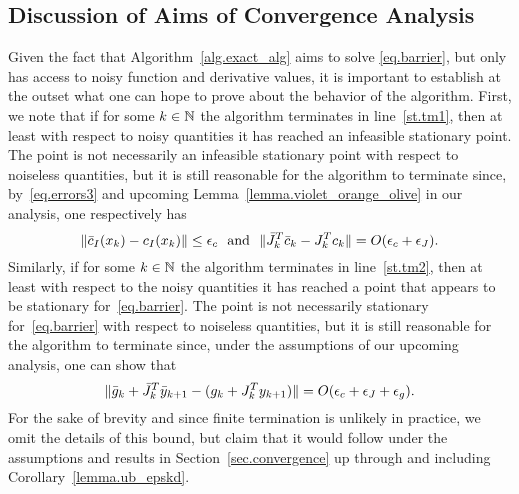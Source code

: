 \subsection{Discussion of Aims of Convergence Analysis}\label{sec.discussion}

Given the fact that Algorithm~\ref{alg.exact_alg} aims to solve \eqref{eq.barrier}, but only has access to noisy function and derivative values, it is important to establish at the outset what one can hope to prove about the behavior of the algorithm.  First, we note that if for some $k \in \mathbb{N}$ the algorithm terminates in line~\ref{st.tm1}, then at least with respect to noisy quantities it has reached an infeasible stationary point.  The point is not necessarily an infeasible stationary point with respect to noiseless quantities, but it is still reasonable for the algorithm to terminate since, by~\eqref{eq.errors3} and upcoming Lemma~\ref{lemma.violet_orange_olive} in our analysis, one respectively has
\begin{equation*}
  \|\ctrue_I(x_k) - c_I(x_k)\| \leq \epsilon_c\ \ \text{and}\ \ \|\Jtrue_k^T \ctrue_k - J_k^T c_k\| = O(\eps_c + \eps_J).
\end{equation*}
Similarly, if for some $k \in \mathbb{N}$ the algorithm terminates in line~\ref{st.tm2}, then at least with respect to the noisy quantities it has reached a point that appears to be stationary for~\eqref{eq.barrier}.  The point is not necessarily stationary for~\eqref{eq.barrier} with respect to noiseless quantities, but it is still reasonable for the algorithm to terminate since, under the assumptions of our upcoming analysis, one can show that
\begin{equation*}
  \|{\bar g}_k + {\bar J}_k^T {\bar y}_{k+1} - (g_k + J_k^T y_{k+1})\| = O(\epsilon_c + \epsilon_J + \epsilon_g).
\end{equation*}
For the sake of brevity and since finite termination is unlikely in practice, we omit the details of this bound, but claim that it would follow under the assumptions and results in Section~\ref{sec.convergence} up through and including Corollary~\ref{lemma.ub_epskd}.

